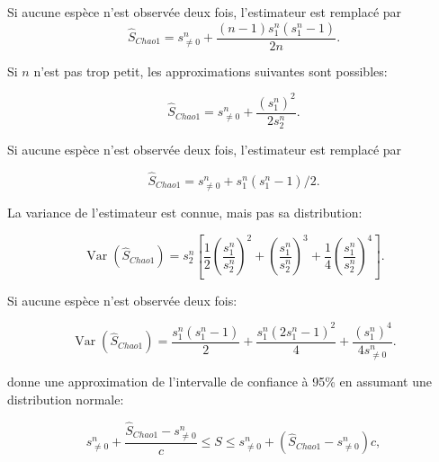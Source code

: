 \documentclass[
  11pt,
  french,
  a4paper,
  extrafontsizes,onecolumn,openright
  ]{memoir}
\begin{document}
Si aucune espèce n'est observée deux fois, l'estimateur est remplacé par
\begin{equation}
  \label{eq:Chao1sansf2}
  {\hat{S}}_\mathit{Chao1} = s^{n}_{\ne 0} + \frac{\left(n-1\right){s^{n}_{1}}\left(s^{n}_{1}-1\right)}{2n}.
\end{equation}

Si \(n\) n'est pas trop petit, les approximations suivantes sont possibles:

\begin{equation}
  \label{eq:Chao1sansn}
  \hat{S}_\mathit{Chao1}
   = {s^{n}_{\ne 0}} + \frac{{\left(s^{n}_{1}\right)}^2}{2s^{n}_{2}}.
\end{equation}

Si aucune espèce n'est observée deux fois, l'estimateur est remplacé \autocite{Chao2004} par

\begin{equation}
  \label{eq:Chao1sansnf2}
  {\hat{S}}_\mathit{Chao1} 
  = {s^{n}_{\ne 0}}+{s^{n}_{1}\left(s^{n}_{1}-1\right)}/{2}.
\end{equation}

La variance de l'estimateur est connue, mais pas sa distribution:

\begin{equation}
  \label{eq:VarChao1}
  \operatorname{Var}{\left({\hat{S}}_\mathit{Chao1}\right)} 
   = {s^{n}_{2}}\left[\frac{1}{2}{\left(\frac{s^{n}_{1}}{s^{n}_{2}}\right)}^2 + {\left(\frac{s^{n}_{1}}{s^{n}_{2}}\right)}^3 + \frac{1}{4}{\left(\frac{s^{n}_{1}}{s^{n}_{2}}\right)}^4\right].
\end{equation}

Si aucune espèce n'est observée deux fois:

\begin{equation}
  \label{eq:VarChao1sansf2}
  \operatorname{Var}{\left({\hat{S}}_\mathit{Chao1}\right)}
  = \frac{s^{n}_{1}\left(s^{n}_{1}-1\right)}{2}
  + \frac{s^{n}_{1}{\left(2s^{n}_{1} -1\right)}^2}{4}
  + \frac{{\left(s^{n}_{1}\right)}^4}{4s^{n}_{\ne 0}}.
\end{equation}

\textcite{Chao1987} donne une approximation de l'intervalle de confiance à 95\% en assumant une distribution normale:

\begin{equation}
  \label{eq:ICChao1}
  s^{n}_{\ne 0}+\frac{{\hat{S}}_\mathit{Chao1}-{s^{n}_{\ne 0}}}{c}\le S\le {s^{n}_{\ne 0}}+\left({\hat{S}}_\mathit{Chao1}-{s^{n}_{\ne 0}}\right)c,
\end{equation}
\end{document}
